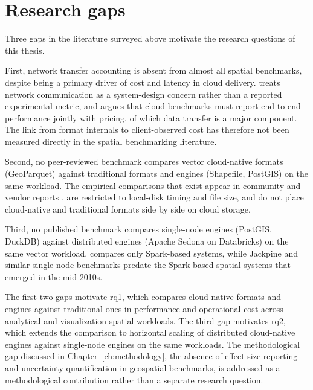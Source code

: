 \section{Research gaps}
\label{related-work:research-gaps}
Three gaps in the literature surveyed above motivate the research questions of this thesis.

First, network transfer accounting is absent from almost all spatial benchmarks, despite being a primary driver of cost and latency in cloud delivery. \textcite{tang2020_locationspark_distributed_spatial_query} treats network communication as a system-design concern rather than a reported experimental metric, and \textcite{folkerts2012_benchmarking_in_the_cloud} argues that cloud benchmarks must report end-to-end performance jointly with pricing, of which data transfer is a major component. The link from format internals to client-observed cost has therefore not been measured directly in the spatial benchmarking literature.

Second, no peer-reviewed benchmark compares vector cloud-native formats (GeoParquet) against traditional formats and engines (Shapefile, PostGIS) on the same workload. The empirical comparisons that exist appear in community and vendor reports \parencite{holmes2023_geoparquet_performance, flatgeobuf2024_flatgeobuf_benchmarks}, are restricted to local-disk timing and file size, and do not place cloud-native and traditional formats side by side on cloud storage.

Third, no published benchmark compares single-node engines (PostGIS, DuckDB) against distributed engines (Apache Sedona on Databricks) on the same vector workload. \textcite{pandey2018_how_good_modern_spatial_analytics} compares only Spark-based systems, while Jackpine \parencite{ray2011_jackpine_spatial_database_benchmark} and similar single-node benchmarks predate the Spark-based spatial systems that emerged in the mid-2010s.

The first two gaps motivate \acrshort{rq}1, which compares cloud-native formats and engines against traditional ones in performance and operational cost across analytical and visualization spatial workloads. The third gap motivates \acrshort{rq}2, which extends the comparison to horizontal scaling of distributed cloud-native engines against single-node engines on the same workloads. The methodological gap discussed in Chapter~\ref{ch:methodology}, the absence of effect-size reporting and uncertainty quantification in geospatial benchmarks, is addressed as a methodological contribution rather than a separate research question.